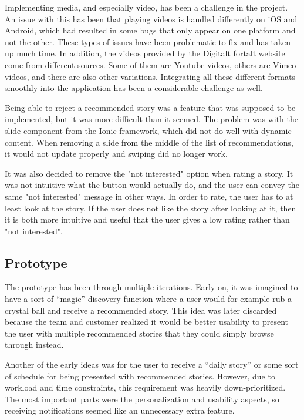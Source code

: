 Implementing media, and especially video, has been a challenge in the project. An issue with this has been that playing videos is handled differently on iOS and Android, which had resulted in some bugs that only appear on one platform and not the other. These types of issues have been problematic to fix and has taken up much time. In addition, the videos provided by the Digitalt fortalt website come from different sources. Some of them are Youtube videos, others are Vimeo videos, and there are also other variations. Integrating all these different formats smoothly into the application has been a considerable challenge as well. \newline

Being able to reject a recommended story was a feature that was supposed to be implemented, but it was more difficult than it seemed. The problem was with the slide component from the Ionic framework, which did not do well with dynamic content. When removing a slide from the middle of the list of recommendations, it would not update properly and swiping did no longer work. \newline

It was also decided to remove the "not interested" option when rating a story. It was not intuitive what the button would actually do, and the user can convey the same "not interested" message in other ways. In order to rate, the user has to at least look at the story. If the user does not like the story after looking at it, then it is both more intuitive and useful that the user gives a low rating rather than "not interested". 

\subsection{Prototype}
\label{subsec:prototype}
The prototype has been through multiple iterations. Early on, it was imagined to have a sort of “magic” discovery function where a user would for example rub a crystal ball and receive a recommended story. This idea was later discarded because the team and customer realized
 it would be better usability to present the user with multiple recommended stories that they could simply browse through instead.\newline

Another of the early ideas was for the user to receive a “daily story” or some sort of schedule for being presented with recommended stories. However, due to workload and time constraints, this requirement was heavily down-prioritized. The most important parts were the personalization and usability aspects, so receiving notifications seemed like an unnecessary extra feature.\newline

